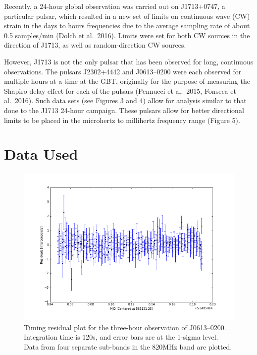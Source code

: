 \documentclass[12pt]{article}
\begin{document}
Recently, a 24-hour global observation was carried out on J1713+0747, a particular pulsar, which
resulted in a new set of limits on continuous wave (CW) strain in the days to
hours frequencies due to the average sampling rate of about 0.5 samples/min (Dolch et al.~2016).
Limits were set for both CW sources in the direction of J1713, as well as
random-direction CW sources.

  However, J1713 is not the only pulsar that has been observed for long,
continuous observations. The pulsars J2302+4442 and J0613--0200 were each observed for
multiple hours at a time at the GBT, originally for the purpose of measuring the Shapiro
delay effect for each of the pulsars (Pennucci et al.~2015, Fonseca et al.~2016). Such data sets (see Figures 3 and 4) allow for analysis similar
to that done to the J1713 24-hour campaign. These pulsars allow for better
directional limits to be placed in the microhertz to millihertz frequency range (Figure 5).

\section{Data Used}
 
\begin{figure}[h!]
    \caption{Timing residual plot for the three-hour observation of J0613--0200.
Integration time is 120s, and error bars are at the 1-sigma level. Data from
four separate sub-bands in the 820MHz band are plotted.}
    \includegraphics[width=\textwidth]{./figures/J0613_residuals.png}
\end{figure}
\end{document}

